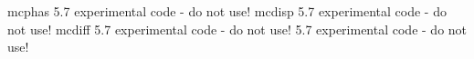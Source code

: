 mcphas 5.7 experimental code - do not use!
mcdisp 5.7 experimental code - do not use!
mcdiff 5.7 experimental code - do not use!
5.7 experimental code - do not use!
